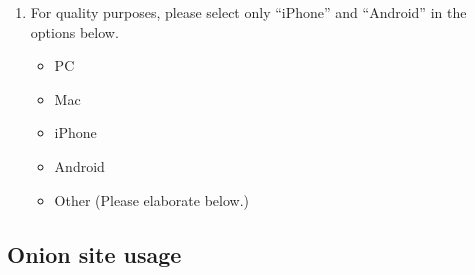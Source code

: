 \begin{enumerate}
    \item For quality purposes, please select only ``iPhone'' and ``Android''
        in the options below.
        \begin{itemize}[label=$\Square$]
            \item PC
            \item Mac
            \item iPhone
            \item Android
            \item Other (Please elaborate below.)
        \end{itemize}
\end{enumerate}

\subsection{Onion site usage}
